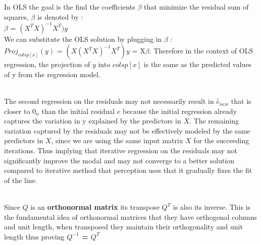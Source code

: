 \documentclass[12pt]{article}
\begin{document}
\begin{enumerate}
In OLS the goal is the find the coefficients \( \beta \) that minimize the residual sum of squares,
\( \beta \) is denoted by : \\
\( \beta\) = \((X^T X)^{-1} X^T)y \) \\

We can substitute the OLS solution by plugging in \( \beta \) : \\
\(Proj_{colsp[x]} (y)\) =  \((X (X^T X)^{-1} X^T)y \) = X\( \beta \). Therefore in the context of OLS regression, the projection of \(y\) into \(colsp[x]\) is the same as the predicted values of y from the regression model.
 
 \\
The second regression on the residuals may not necessarily result in \( \hat{e}_{new}\) that is closer to \(0_n\) than the initial residual \(e\) because the initial regression already captures the variation in y explained by the predictors in \(X\). The remaining variation captured by the residuals may not be effectively modeled by the same predictors in \(X\), since we are using the same input matrix \(X\) for the succeeding iterations. Thus implying that iterative regression on the residuals may not significantly improve the modal and may not converge to a better solution compared to iterative method that perception uses that it gradually fixes the fit of the line.


 \\ 
Since \(Q\) is an \textbf{orthonormal  matrix} its transpose \(Q^T\) is also its inverse. This is the fundamental idea of orthonormal  matrices that they have orthogonal columns and unit length, when transposed they maintain their orthogonality and unit length thus proving
\textbf{\(Q^{-1}\) = \(Q^T\)}



\end{enumerate}
\end{document}
